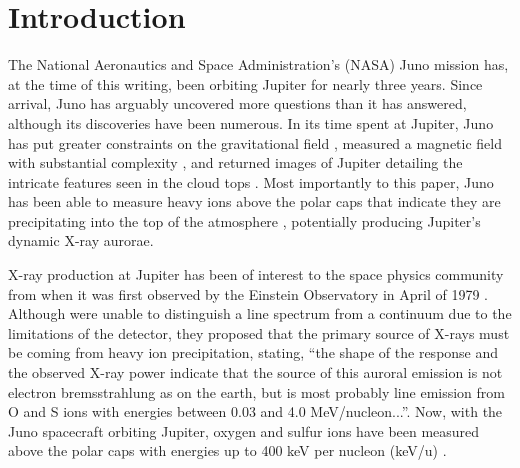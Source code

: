 \documentclass[draft]{agujournal2018}
\begin{document}
%
%

\section{Introduction}

The National Aeronautics and Space Administration's (NASA) Juno mission has, at the time of this writing, been orbiting Jupiter for nearly three years.
Since arrival, Juno has arguably uncovered more questions than it has answered, although its discoveries have been numerous.
In its time spent at Jupiter, Juno has put greater constraints on the gravitational field \citep{folkner2017,iess2018}, measured a magnetic field with substantial complexity \citep{connerney2017,connerney2018,moore2018}, and returned images of Jupiter detailing the intricate features seen in the cloud tops \citep{orton2017,sanchez2018}.
Most importantly to this paper, Juno has been able to measure heavy ions above the polar caps that indicate they are precipitating into the top of the atmosphere \citep{haggerty2017,clark2017a,clark2017b}, potentially producing Jupiter's dynamic X-ray aurorae.

X-ray production at Jupiter has been of interest to the space physics community from when it was first observed by the Einstein Observatory in April of 1979 \citep{metzger1983}.
Although \citet{metzger1983} were unable to distinguish a line spectrum from a continuum due to the limitations of the detector, they proposed that the primary source of X-rays must be coming from heavy ion precipitation, stating, ``the shape of the response and the observed X-ray power indicate that the source of this auroral emission is not electron bremsstrahlung as on the earth, but is most probably line emission from O and S ions with energies between 0.03 and 4.0 MeV/nucleon...''.
Now, with the Juno spacecraft orbiting Jupiter, oxygen and sulfur ions have been measured above the polar caps with energies up to 400 keV per nucleon (keV/u) \citep{clark2017a,clark2017b,haggerty2017}. 
\end{document}
